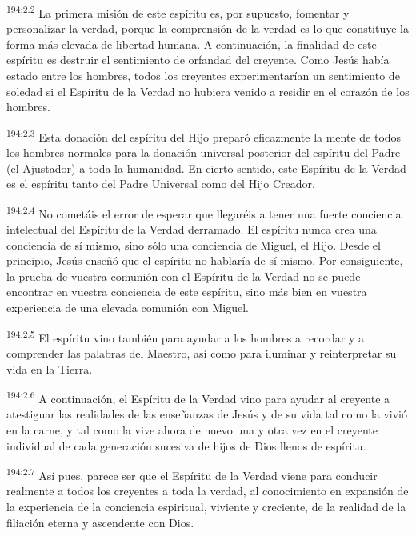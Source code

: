 \par 
\textsuperscript{194:2.2} La primera misión de este espíritu es, por supuesto, fomentar y personalizar la verdad, porque la comprensión de la verdad es lo que constituye la forma más elevada de libertad humana. A continuación, la finalidad de este espíritu es destruir el sentimiento de orfandad del creyente. Como Jesús había estado entre los hombres, todos los creyentes experimentarían un sentimiento de soledad si el Espíritu de la Verdad no hubiera venido a residir en el corazón de los hombres.

\par 
\textsuperscript{194:2.3} Esta donación del espíritu del Hijo preparó eficazmente la mente de todos los hombres normales para la donación universal posterior del espíritu del Padre (el Ajustador) a toda la humanidad. En cierto sentido, este Espíritu de la Verdad es el espíritu tanto del Padre Universal como del Hijo Creador.

\par 
\textsuperscript{194:2.4} No cometáis el error de esperar que llegaréis a tener una fuerte conciencia intelectual del Espíritu de la Verdad derramado. El espíritu nunca crea una conciencia de sí mismo, sino sólo una conciencia de Miguel, el Hijo. Desde el principio, Jesús enseñó que el espíritu no hablaría de sí mismo. Por consiguiente, la prueba de vuestra comunión con el Espíritu de la Verdad no se puede encontrar en vuestra conciencia de este espíritu, sino más bien en vuestra experiencia de una elevada comunión con Miguel.

\par 
\textsuperscript{194:2.5} El espíritu vino también para ayudar a los hombres a recordar y a comprender las palabras del Maestro, así como para iluminar y reinterpretar su vida en la Tierra.

\par 
\textsuperscript{194:2.6} A continuación, el Espíritu de la Verdad vino para ayudar al creyente a atestiguar las realidades de las enseñanzas de Jesús y de su vida tal como la vivió en la carne, y tal como la vive ahora de nuevo una y otra vez en el creyente individual de cada generación sucesiva de hijos de Dios llenos de espíritu.

\par 
\textsuperscript{194:2.7} Así pues, parece ser que el Espíritu de la Verdad viene para conducir realmente a todos los creyentes a toda la verdad, al conocimiento en expansión de la experiencia de la conciencia espiritual, viviente y creciente, de la realidad de la filiación eterna y ascendente con Dios.

